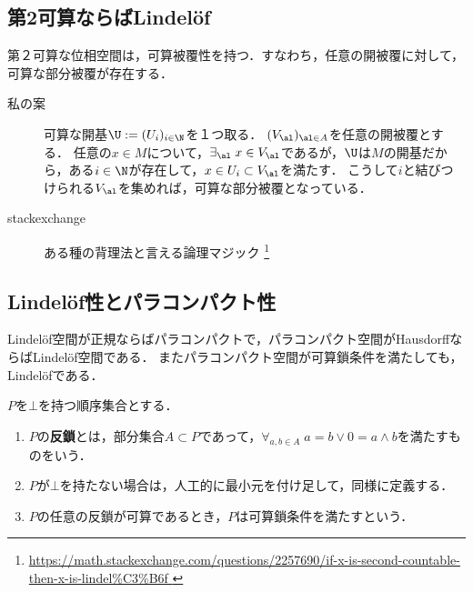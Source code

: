 \documentclass[uplatex,dvipdfmx]{jsreport}
\begin{document}
\subsection{第2可算ならばLindelöf}

\begin{lemma}
    第２可算な位相空間は，可算被覆性を持つ．すなわち，任意の開被覆に対して，可算な部分被覆が存在する．
\end{lemma}
\begin{Proof}\mbox{}
    \begin{description}
        \item[私の案] 可算な開基$\U:=(U_i)_{i\in\N}$を１つ取る．
        $(V_\al)_{\al\in A}$を任意の開被覆とする．
        任意の$x\in M$について，$\exists_{\al}\;x\in V_\al$であるが，$\U$は$M$の開基だから，ある$i\in\N$が存在して，$x\in U_i\subset V_\al$を満たす．
        こうして$i$と結びつけられる$V_\al$を集めれば，可算な部分被覆となっている． 
        \item[stackexchange] ある種の背理法と言える論理マジック
    \footnote{\url{
        https://math.stackexchange.com/questions/2257690/if-x-is-second-countable-then-x-is-lindel%
    }}
    \end{description}
\end{Proof}

\subsection{Lindelöf性とパラコンパクト性}

\begin{tcolorbox}[colframe=ForestGreen, colback=ForestGreen!10!white,breakable,colbacktitle=ForestGreen!40!white,coltitle=black,fonttitle=\bfseries\sffamily,
title=]
    Lindelöf空間が正規ならばパラコンパクトで，パラコンパクト空間がHausdorffならばLindelöf空間である．
    またパラコンパクト空間が可算鎖条件を満たしても，Lindelöfである．
\end{tcolorbox}

\begin{definition}
    $P$を$\bot$を持つ順序集合とする．
    \begin{enumerate}
        \item $P$の\textbf{反鎖}とは，部分集合$A\subset P$であって，$\forall_{a,b\in A}\;a=b\lor0=a\land b$を満たすものをいう．
        \item $P$が$\bot$を持たない場合は，人工的に最小元を付け足して，同様に定義する．
        \item $P$の任意の反鎖が可算であるとき，$P$は可算鎖条件を満たすという．
    \end{enumerate}
\end{definition}
\end{document}

